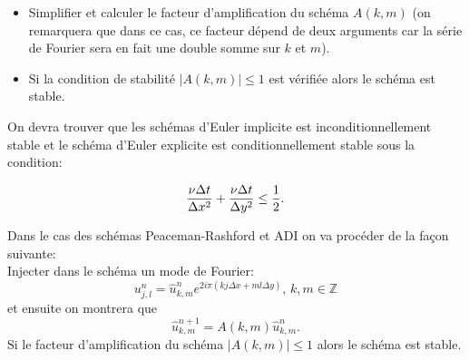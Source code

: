 \documentclass[12pt,a4paper]{article}
\begin{document}
\begin{enumerate}
\begin{itemize}
\item Simplifier et calculer le facteur d'amplification du schéma $A(k,m)$ (on remarquera que dans ce cas, ce facteur dépend de deux arguments car la série de Fourier sera en fait une double somme sur $k$ et $m$).
\item Si la condition de stabilité $|A(k,m)| \le 1$ est vérifiée alors le schéma est stable.
\end{itemize}

On devra trouver que les schémas d'Euler implicite est inconditionnellement stable et le schéma d'Euler explicite est conditionnellement stable sous la condition:

$$
\frac{\nu\Delta t}{\Delta x^2} +\frac{\nu\Delta t}{\Delta y^2} \le \frac{1}{2}.\\
$$

\noindent Dans le cas des schémas Peaceman-Rashford et ADI on va procéder de la façon suivante:\\
Injecter dans le schéma un mode de Fourier:
$$
u^n_{j,l} = \hat{u}^n_{k,m}  e^{2i\pi (kj\Delta x + ml\Delta y)},\, k,m\in \mathbb{Z}
$$
et ensuite on montrera que
$$
 \hat{u}^{n+1}_{k,m} = A(k,m)  \hat{u}^{n}_{k,m}.
$$
Si le facteur d'amplification du schéma $|A(k,m)|\le 1$ alors le schéma est stable.


\end{enumerate}

\end{document}
